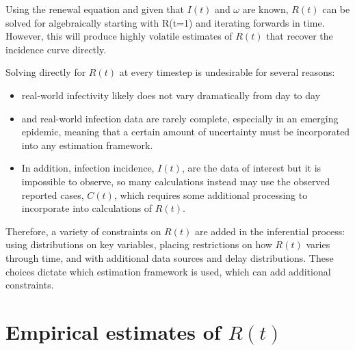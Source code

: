 \documentclass[
  letterpaper,
  DIV=11,
  numbers=noendperiod]{scrreprt}
\providecommand{\tightlist}{%
  \setlength{\itemsep}{0pt}\setlength{\parskip}{0pt}}\usepackage{longtable,booktabs,array}
\begin{document}
\begin{tcolorbox}[enhanced jigsaw, opacityback=0, title=\textcolor{quarto-callout-warning-color}{\faExclamationTriangle}\hspace{0.5em}{Solving for \(R(t)\)}, leftrule=.75mm, toprule=.15mm, bottomrule=.15mm, coltitle=black, opacitybacktitle=0.6, toptitle=1mm, colframe=quarto-callout-warning-color-frame, colback=white, rightrule=.15mm, colbacktitle=quarto-callout-warning-color!10!white, titlerule=0mm, breakable, bottomtitle=1mm, arc=.35mm, left=2mm]

Using the renewal equation and given that \(I(t)\) and \(ω\) are known,
\(R(t)\) can be solved for algebraically starting with R(t=1) and
iterating forwards in time. However, this will produce highly volatile
estimates of \(R(t)\) that recover the incidence curve directly.

\end{tcolorbox}

Solving directly for \(R(t)\) at every timestep is undesirable for
several reasons:

\begin{itemize}
\tightlist
\item
  real-world infectivity likely does not vary dramatically from day to
  day
\item
  and real-world infection data are rarely complete, especially in an
  emerging epidemic, meaning that a certain amount of uncertainty must
  be incorporated into any estimation framework.
\item
  In addition, infection incidence, \(I(t)\), are the data of interest
  but it is impossible to observe, so many calculations instead may use
  the observed reported cases, \(C(t)\), which requires some additional
  processing to incorporate into calculations of \(R(t)\).
\end{itemize}

Therefore, a variety of constraints on \(R(t)\) are added in the
inferential process: using distributions on key variables, placing
restrictions on how \(R(t)\) varies through time, and with additional
data sources and delay distributions. These choices dictate which
estimation framework is used, which can add additional constraints.

\section*{\texorpdfstring{Empirical estimates of
\(R(t)\)}{Empirical estimates of R(t)}}\label{empirical-estimates-of-rt}
\end{document}
